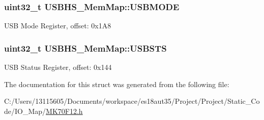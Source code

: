 \subsubsection[{U\+S\+B\+M\+O\+D\+E}]{\setlength{\rightskip}{0pt plus 5cm}uint32\+\_\+t U\+S\+B\+H\+S\+\_\+\+Mem\+Map\+::\+U\+S\+B\+M\+O\+D\+E}\label{struct_u_s_b_h_s___mem_map_afe4ec3963906653c83890dea008fac84}
U\+S\+B Mode Register, offset\+: 0x1\+A8 \hypertarget{struct_u_s_b_h_s___mem_map_ab651a6e6b81d8e4f97a9637833cc45b2}{}
\subsubsection[{U\+S\+B\+S\+T\+S}]{\setlength{\rightskip}{0pt plus 5cm}uint32\+\_\+t U\+S\+B\+H\+S\+\_\+\+Mem\+Map\+::\+U\+S\+B\+S\+T\+S}\label{struct_u_s_b_h_s___mem_map_ab651a6e6b81d8e4f97a9637833cc45b2}
U\+S\+B Status Register, offset\+: 0x144 

The documentation for this struct was generated from the following file\+:\begin{DoxyCompactItemize}
\item 
C\+:/\+Users/13115605/\+Documents/workspace/es18aut35/\+Project/\+Project/\+Static\+\_\+\+Code/\+I\+O\+\_\+\+Map/\hyperlink{_m_k70_f12_8h}{M\+K70\+F12.\+h}\end{DoxyCompactItemize}
